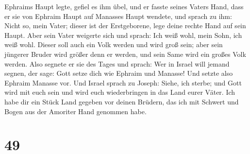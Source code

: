 Ephraims Haupt legte, gefiel es ihm übel, und er fasste seines Vaters
Hand, dass er sie von Ephraim Haupt auf Manasses Haupt wendete,
 und sprach zu ihm: Nicht so, mein Vater; dieser ist der
Erstgeborene, lege deine rechte Hand auf sein Haupt. 
Aber sein Vater weigerte sich und sprach: Ich weiß wohl, mein Sohn, ich
weiß wohl. Dieser soll auch ein Volk werden und wird groß sein; aber
sein jüngerer Bruder wird größer denn er werden, und sein Same wird ein
großes Volk werden.  Also segnete er sie des Tages und
sprach: Wer in Israel will jemand segnen, der sage: Gott setze dich wie
Ephraim und Manasse! Und setzte also Ephraim Manasse vor.
 Und Israel sprach zu Joseph: Siehe, ich sterbe; und Gott
wird mit euch sein und wird euch wiederbringen in das Land eurer Väter.
 Ich habe dir ein Stück Land gegeben vor deinen Brüdern,
das ich mit Schwert und Bogen aus der Amoriter Hand genommen habe.

\hypertarget{section-48}{%
\section{49}\label{section-48}}

